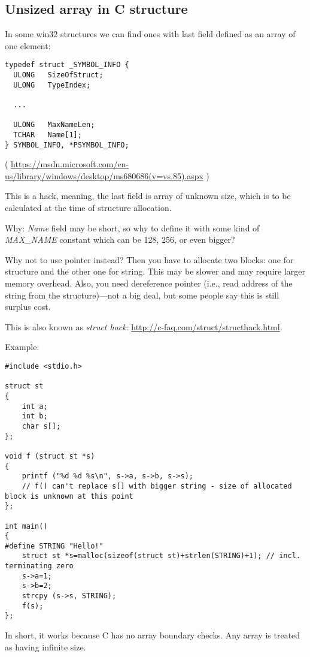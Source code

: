 \subsection{Unsized array in C structure}

In some win32 structures we can find ones with last field defined as an array of one element:

\begin{lstlisting}[style=customc]
typedef struct _SYMBOL_INFO {
  ULONG   SizeOfStruct;
  ULONG   TypeIndex;
  
  ...

  ULONG   MaxNameLen;
  TCHAR   Name[1];
} SYMBOL_INFO, *PSYMBOL_INFO;
\end{lstlisting}

( \url{https://msdn.microsoft.com/en-us/library/windows/desktop/ms680686(v=vs.85).aspx} )

This is a hack, meaning, the last field is array of unknown size,
which is to be calculated at the time of structure allocation.

Why: \emph{Name} field may be short, so why to define it with some kind of \emph{MAX\_NAME}
constant which can be 128, 256, or even bigger?

Why not to use pointer instead? Then you have to allocate two blocks: one for structure and the other one for string.
This may be slower and may require larger memory overhead.
Also, you need dereference pointer (i.e., read address of the string from the structure)---not a big deal, but some
people say this is still surplus cost.

This is also known as \emph{struct hack}: \url{http://c-faq.com/struct/structhack.html}.

Example:

\begin{lstlisting}[style=customc]
#include <stdio.h>

struct st
{
	int a;
	int b;
	char s[];
};

void f (struct st *s)
{
	printf ("%d %d %s\n", s->a, s->b, s->s);
	// f() can't replace s[] with bigger string - size of allocated block is unknown at this point
};

int main()
{
#define STRING "Hello!"
	struct st *s=malloc(sizeof(struct st)+strlen(STRING)+1); // incl. terminating zero
	s->a=1;
	s->b=2;
	strcpy (s->s, STRING);
	f(s);
};
\end{lstlisting}

In short, it works because C has no array boundary checks. Any array is treated as having infinite size.

